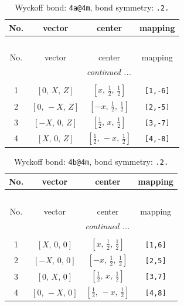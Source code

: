 \documentclass[fleqn,8pt]{jsarticle}
\begin{document}
\begin{longtable}{cccc}
\caption{Wyckoff bond: {\tt 4a@4m}, bond symmetry: {\tt .2.}}
 \\
 \hline \hline
No. & vector & center & mapping \\ \hline \endfirsthead

\multicolumn{3}{l}{\tablename\ \thetable{}} \\
 \hline \hline
No. & vector & center & mapping \\ \hline \endhead

 \hline \hline
\multicolumn{3}{r}{\footnotesize\it continued ...} \\ \endfoot

 \hline \hline
\multicolumn{3}{r}{} \\ \endlastfoot

1 & $\left[ 0,\, X,\, Z \right]$ & $\left[ x,\, \frac{1}{2},\, \frac{1}{2} \right]$ & {\tt [1,-6]} \\ \hline
2 & $\left[ 0,\, - X,\, Z \right]$ & $\left[ - x,\, \frac{1}{2},\, \frac{1}{2} \right]$ & {\tt [2,-5]} \\ \hline
3 & $\left[ - X,\, 0,\, Z \right]$ & $\left[ \frac{1}{2},\, x,\, \frac{1}{2} \right]$ & {\tt [3,-7]} \\ \hline
4 & $\left[ X,\, 0,\, Z \right]$ & $\left[ \frac{1}{2},\, - x,\, \frac{1}{2} \right]$ & {\tt [4,-8]} \\
\end{longtable}
\renewcommand{\arraystretch}{1.2}
\begin{longtable}{cccc}
\caption{Wyckoff bond: {\tt 4b@4m}, bond symmetry: {\tt .2.}}
 \\
 \hline \hline
No. & vector & center & mapping \\ \hline \endfirsthead

\multicolumn{3}{l}{\tablename\ \thetable{}} \\
 \hline \hline
No. & vector & center & mapping \\ \hline \endhead

 \hline \hline
\multicolumn{3}{r}{\footnotesize\it continued ...} \\ \endfoot

 \hline \hline
\multicolumn{3}{r}{} \\ \endlastfoot

1 & $\left[ X,\, 0,\, 0 \right]$ & $\left[ x,\, \frac{1}{2},\, \frac{1}{2} \right]$ & {\tt [1,6]} \\ \hline
2 & $\left[ - X,\, 0,\, 0 \right]$ & $\left[ - x,\, \frac{1}{2},\, \frac{1}{2} \right]$ & {\tt [2,5]} \\ \hline
3 & $\left[ 0,\, X,\, 0 \right]$ & $\left[ \frac{1}{2},\, x,\, \frac{1}{2} \right]$ & {\tt [3,7]} \\ \hline
4 & $\left[ 0,\, - X,\, 0 \right]$ & $\left[ \frac{1}{2},\, - x,\, \frac{1}{2} \right]$ & {\tt [4,8]} \\
\end{longtable}
\end{document}
